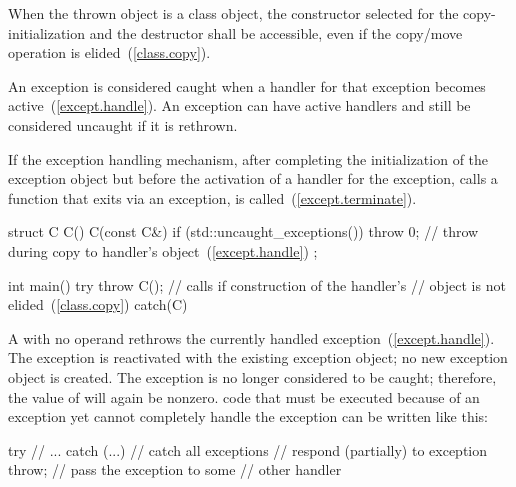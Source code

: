 \pnum
{}%
%
When the thrown object is a class object, the constructor selected for
the copy-initialization and the
destructor shall be accessible, even if the copy/move operation is
elided~(\ref{class.copy}).

\pnum
{}%
%
%
An exception is considered caught when a handler for that exception
becomes active~(\ref{except.handle}).
\enternote
An exception can have active handlers and still be considered uncaught if
it is rethrown.
\exitnote

\pnum
{}%
%
If the exception handling mechanism, after completing the initialization of the
exception object but before the activation of a handler for the exception,
calls a function that exits via an
exception,  is called~(\ref{except.terminate}). \enterexample

\begin{codeblock}
struct C {
  C() { }
  C(const C&) {
    if (std::uncaught_exceptions()) {
      throw 0;      // throw during copy to handler's  object~(\ref{except.handle})
    }
  }
};

int main() {
  try {
    throw C();      // calls  if construction of the handler's
                    //  object is not elided~(\ref{class.copy})
  } catch(C) { }
}
\end{codeblock}

\exitexample

\pnum
{}%
A
with no operand rethrows the currently handled exception~(\ref{except.handle}).
The exception is reactivated with the existing exception object;
no new exception object is created.
The exception
is no longer considered to be caught; therefore, the value
of
will again be nonzero.
\enterexample
code that must be executed because of an exception yet cannot
completely handle the exception can be written like this:
\begin{codeblock}
try {
    // ...
} catch (...) {     // catch all exceptions
  // respond (partially) to exception
  throw;            // pass the exception to some
                    // other handler
}
\end{codeblock}
\exitexample

